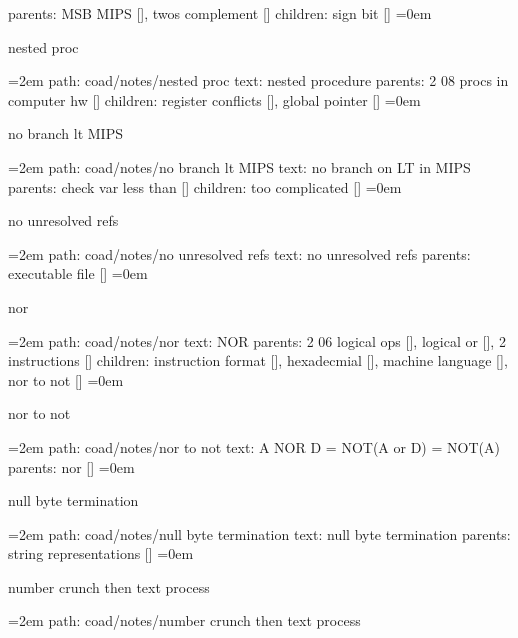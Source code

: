 parents:  MSB MIPS [], twos complement []
\smallskip
children: sign bit []
\smallskip
\leftskip=0em
\par\endgroup
\bigskip
{}
nested proc
\smallskip
\par\begingroup
\leftskip=2em
path: coad/notes/nested proc
\smallskip
text:  nested procedure
\smallskip
parents:  2 08 procs in computer hw []
\smallskip
children: register conflicts [], global pointer []
\smallskip
\leftskip=0em
\par\endgroup
\bigskip
{}
no branch lt MIPS
\smallskip
\par\begingroup
\leftskip=2em
path: coad/notes/no branch lt MIPS
\smallskip
text:  no branch on LT in MIPS
\smallskip
parents:  check var less than []
\smallskip
children: too complicated []
\smallskip
\leftskip=0em
\par\endgroup
\bigskip
{}
no unresolved refs
\smallskip
\par\begingroup
\leftskip=2em
path: coad/notes/no unresolved refs
\smallskip
text:  no unresolved refs
\smallskip
parents:  executable file []
\smallskip
\leftskip=0em
\par\endgroup
\bigskip
{}
nor
\smallskip
\par\begingroup
\leftskip=2em
path: coad/notes/nor
\smallskip
text:  NOR
\smallskip
parents:  2 06 logical ops [], logical or [], 2 instructions []
\smallskip
children: instruction format [], hexadecmial [], machine language [], nor to not []
\smallskip
\leftskip=0em
\par\endgroup
\bigskip
{}
nor to not
\smallskip
\par\begingroup
\leftskip=2em
path: coad/notes/nor to not
\smallskip
text:  A NOR D = NOT(A or D) = NOT(A)
\smallskip
parents:  nor []
\smallskip
\leftskip=0em
\par\endgroup
\bigskip
{}
null byte termination
\smallskip
\par\begingroup
\leftskip=2em
path: coad/notes/null byte termination
\smallskip
text:  null byte termination
\smallskip
parents:  string representations []
\smallskip
\leftskip=0em
\par\endgroup
\bigskip
{}
number crunch then text process
\smallskip
\par\begingroup
\leftskip=2em
path: coad/notes/number crunch then text process
